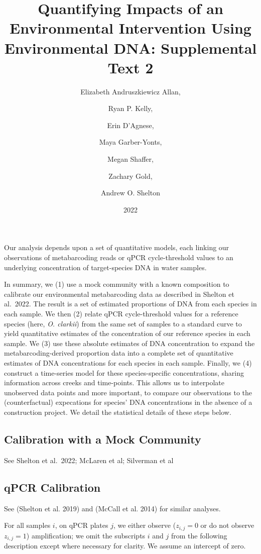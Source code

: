 \documentclass[
]{article}
\title{Quantifying Impacts of an Environmental Intervention Using
Environmental DNA: Supplemental Text 2}
\author{Elizabeth Andruszkiewicz Allan, \and Ryan P. Kelly, \and Erin
D'Agnese, \and Maya Garber-Yonts, \and Megan Shaffer, \and Zachary
Gold, \and Andrew O. Shelton}
\date{2022}
\begin{document}
\maketitle

Our analysis depends upon a set of quantitative models, each linking our
observations of metabarcoding reads or qPCR cycle-threshold values to an
underlying concentration of target-species DNA in water samples.

In summary, we (1) use a mock community with a known composition to
calibrate our environmental metabarcoding data as described in Shelton
et al.~2022. The result is a set of estimated proportions of DNA from
each species in each sample. We then (2) relate qPCR cycle-threshold
values for a reference species (here, \emph{O. clarkii}) from the same
set of samples to a standard curve to yield quantitative estimates of
the concentration of our reference species in each sample. We (3) use
these absolute estimates of DNA concentration to expand the
metabarcoding-derived proportion data into a complete set of
quantitative estimates of DNA concentrations for each species in each
sample. Finally, we (4) construct a time-series model for these
species-specific concentrations, sharing information across creeks and
time-points. This allows us to interpolate unobserved data points and
more important, to compare our observations to the (counterfactual)
expecations for species' DNA concentrations in the absence of a
construction project. We detail the statistical details of these steps
below.

\hypertarget{calibration-with-a-mock-community}{%
\subsection{Calibration with a Mock
Community}\label{calibration-with-a-mock-community}}

See Shelton et al.~2022; McLaren et al; Silverman et al

\hypertarget{qpcr-calibration}{%
\subsection{qPCR Calibration}\label{qpcr-calibration}}

See (Shelton et al. 2019) and (McCall et al. 2014) for similar analyses.

For all samples \(i\), on qPCR plates \(j\), we either observe
(\(z_{i,j} = 0\) or do not observe \(z_{i,j} = 1\)) amplification; we
omit the subscripts \(i\) and \(j\) from the following description
except where necessary for clarity. We assume an intercept of zero.
\end{document}
